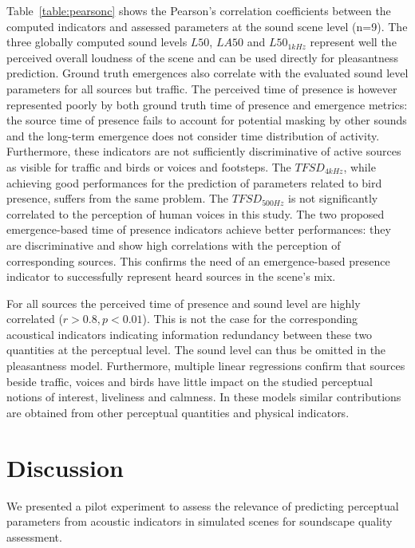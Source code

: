 \documentclass{article}
\begin{document}
\begin{sloppy}
Table~\ref{table:pearsonc} shows the Pearson's correlation coefficients between the computed indicators and assessed parameters at the sound scene level (n=9). The three globally computed sound levels $L50$, $LA50$ and $L50_{1kHz}$ represent well the perceived overall loudness of the scene and can be used directly for pleasantness prediction. Ground truth emergences also correlate with the evaluated sound level parameters for all sources but traffic. The perceived time of presence is however represented poorly by both ground truth time of presence and emergence metrics: the source time of presence fails to account for potential masking by other sounds and the long-term emergence does not consider time distribution of activity. Furthermore, these indicators are not sufficiently discriminative of active sources as visible for traffic and birds or voices and footsteps. The $TFSD_{4kHz}$, while achieving good performances for the prediction of parameters related to bird presence, suffers from the same problem. The $TFSD_{500Hz}$ is not significantly correlated to the perception of human voices in this study. The two proposed emergence-based time of presence indicators achieve better performances: they are discriminative and show high correlations with the perception of corresponding sources. This confirms the need of an emergence-based presence indicator to successfully represent heard sources in the scene's mix.

For all sources the perceived time of presence and sound level are highly correlated ($r>0.8, p<0.01$). This is not the case for the corresponding acoustical indicators indicating information redundancy between these two quantities at the perceptual level. The sound level can thus be omitted in the pleasantness model. Furthermore, multiple linear regressions confirm that sources beside traffic, voices and birds have little impact on the studied perceptual notions of interest, liveliness and calmness. In these models similar contributions are obtained from other perceptual quantities and physical indicators.

\section{Discussion}
\label{sec:disc}

We presented a pilot experiment to assess the relevance of predicting perceptual parameters from acoustic indicators in simulated scenes for soundscape quality assessment.


\end{sloppy}
\end{document}
